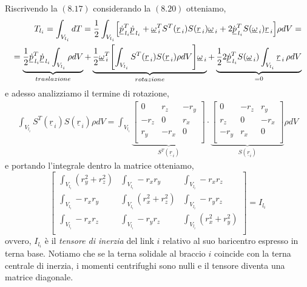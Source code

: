 Riscrivendo la $(8.17)$ considerando la $(8.20)$ otteniamo,
\begin{align*}
	T_{l_i} = \int_{V_{l_i}} dT = \frac{1}{2} \int_{V_{l_i}} \Bigl[ \underline{\dot{p}}_{\,l_i}^T \underline{\dot{p}}_{\,l_i} + \underline{\omega}_{\,i}^T S^T(\underline{r}_{\,i}) S(\underline{r}_{\,i})\underline{\omega}_{\,i} + 2 \dot{\underline{p}}_{\,l_i}^T S(\underline{\omega}_{\,i})\underline{r}_{\,i} \Bigr] \rho dV = \\
	= \underbrace{\frac{1}{2} \underline{\dot{p}}_{\,l_i}^T \underline{\dot{p}}_{\,l_i} \int_{V_{l_i}} \rho dV}_{traslazione} + \underbrace{\frac{1}{2} \underline{\omega}_{\,i}^T \Biggl[ \int_{V_{l_i}} S^T(\underline{r}_{\,i})S(\underline{r}_{\,i}) \rho dV \Biggr] \underline{\omega}_{\,i}}_{rotazione} + \underbrace{\frac{1}{2} 2 \underline{\dot{p}}_{\,l_i}^T S(\underline{\omega}_{\,i}) \int_{V_{l_i}} \underline{r}_{\,i} \, \rho dV}_{= 0}
\end{align*}
e adesso analizziamo il termine di rotazione, 
\begin{align*}
	\int_{V_{l_i}} S^T(\underline{r}_{\,i})S(\underline{r}_{\,i}) \rho dV = 
	\int_{V_{l_i}}
	\underbrace{
	\begin{bmatrix}
		0 & r_z & -r_y \\
		-r_z & 0 & r_x \\
		r_y & -r_x & 0 \\
	\end{bmatrix}
	}_{S^T(\underline{r}_{\,i})}
	\cdot
	\underbrace{
	\begin{bmatrix}
		0 & -r_z & r_y \\
		r_z & 0 & -r_x \\
		-r_y & r_x & 0 \\
	\end{bmatrix}
	}_{S(\underline{r}_i)}
	\rho dV
\end{align*}
e portando l'integrale dentro la matrice otteniamo,
\begin{equation}
	\begin{bmatrix}
		\int_{V_{l_i}} (r_y^2 + r_z^2) & \int_{V_{l_i}} - r_x r_y & \int_{V_{l_i}} -r_x r_z \\
		\int_{V_{l_i}} -r_x r_y & \int_{V_{l_i}} (r_x^2 + r_z^2) & \int_{V_{l_i}} -r_y r_z \\
		\int_{V_{l_i}} -r_x r_z & \int_{V_{l_i}} -r_y r_z & \int_{V_{l_i}} (r_x^2 + r_y^2) \\
	\end{bmatrix}
	= I_{l_i}
\end{equation}
ovvero, $I_{l_i}$ è il \emph{tensore di inerzia} del link $i$ relativo al suo baricentro espresso in terna base. Notiamo che se la terna solidale al braccio $i$ coincide con la terna centrale di inerzia, i momenti centrifughi sono nulli e il tensore diventa una matrice diagonale.

